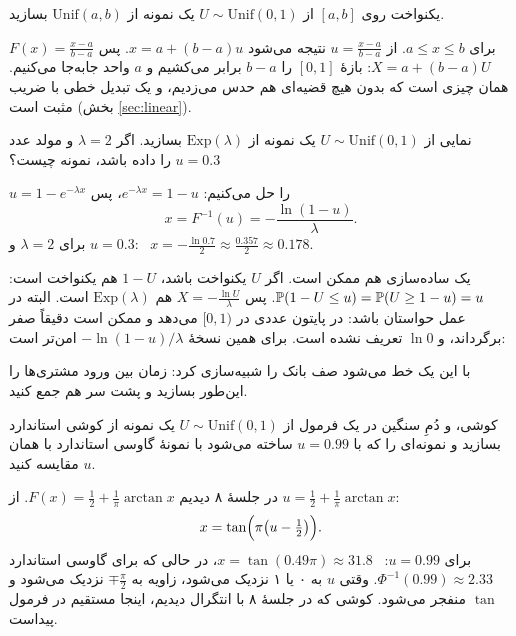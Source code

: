 \begin{example}[label=ex:inv-unif]{یکنواخت روی $[a,b]$}
از $U\sim\mathrm{Unif}(0,1)$ یک نمونه از $\mathrm{Unif}(a,b)$ بسازید.
\begin{solution}
$F(x)=\frac{x-a}{b-a}$ برای $a\le x\le b$. از $u=\frac{x-a}{b-a}$ نتیجه می‌شود $x=a+(b-a)u$. پس $X=a+(b-a)U$: بازهٔ $[0,1]$ را $b-a$ برابر می‌کشیم و $a$ واحد جابه‌جا می‌کنیم. همان چیزی است که بدون هیچ قضیه‌ای هم حدس می‌زدیم، و یک تبدیل خطی با ضریب مثبت است (بخش \ref{sec:linear}).
\end{solution}
\end{example}

\begin{example}[label=ex:inv-exp]{نمایی}
از $U\sim\mathrm{Unif}(0,1)$ یک نمونه از $\mathrm{Exp}(\lambda)$ بسازید. اگر $\lambda=2$ و مولد عدد $u=0.3$ را داده باشد، نمونه چیست؟
\begin{solution}
$u=1-e^{-\lambda x}$ را حل می‌کنیم: $e^{-\lambda x}=1-u$، پس
\[ x=F^{-1}(u)=-\frac{\ln(1-u)}{\lambda}. \]
برای $\lambda=2$ و $u=0.3$: \ $x=-\frac{\ln0.7}{2}\approx\frac{0.357}{2}\approx0.178$.

یک ساده‌سازی هم ممکن است. اگر $U$ یکنواخت باشد، $1-U$ هم یکنواخت است: ${\P(1-U\le u)=\P(U\ge1-u)=u}$. پس $X=-\frac{\ln U}{\lambda}$ هم $\mathrm{Exp}(\lambda)$ است. البته در عمل حواستان باشد:  در پایتون عددی در $[0,1)$ می‌دهد و ممکن است دقیقاً صفر برگرداند، و $\ln0$ تعریف نشده است. برای همین نسخهٔ ${-\ln(1-u)/\lambda}$ امن‌تر است:
\begin{center}
\end{center}
با این یک خط می‌شود صف بانک را شبیه‌سازی کرد: زمان بین ورود مشتری‌ها را این‌طور بسازید و پشت سر هم جمع کنید.
\end{solution}
\end{example}

\begin{example}[label=ex:inv-cauchy]{کوشی، و دُمِ سنگین در یک فرمول}
از $U\sim\mathrm{Unif}(0,1)$ یک نمونه از کوشی استاندارد بسازید و نمونه‌ای را که با $u=0.99$ ساخته می‌شود با نمونهٔ گاوسی استاندارد با همان $u$ مقایسه کنید.
\begin{solution}
در جلسهٔ ۸ دیدیم $F(x)=\frac12+\frac1\pi\arctan x$. از $u=\frac12+\frac1\pi\arctan x$:
\[ x=\tan\Bigl(\pi\bigl(u-\tfrac12\bigr)\Bigr). \]
برای $u=0.99$: \ $x=\tan(0.49\pi)\approx31.8$، در حالی که برای گاوسی استاندارد $\Phi^{-1}(0.99)\approx2.33$. وقتی $u$ به ۰ یا ۱ نزدیک می‌شود، زاویه به $\mp\frac\pi2$ نزدیک می‌شود و $\tan$ منفجر می‌شود.  کوشی که در جلسهٔ ۸ با انتگرال دیدیم، اینجا مستقیم در فرمول پیداست.
\end{solution}
\end{example}




